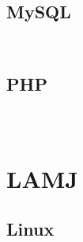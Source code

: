 \begin{lstlisting}[language=bash]

\end{lstlisting}



\begin{lstlisting}[language=bash]

\end{lstlisting}


\section{MySQL}


\begin{lstlisting}[language=bash]

\end{lstlisting}




\begin{lstlisting}[language=bash]

\end{lstlisting}


\section{PHP}


\begin{lstlisting}[language=bash]

\end{lstlisting}




\begin{lstlisting}[language=bash]

\end{lstlisting}




\begin{lstlisting}[language=bash]

\end{lstlisting}

\chapter{LAMJ}



\section{Linux}



